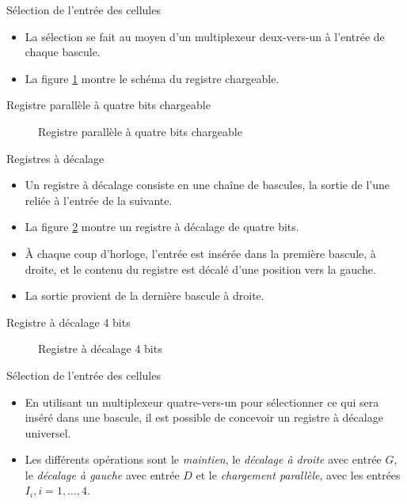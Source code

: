 \documentclass[presentation]{beamer}
\begin{document}
\begin{frame}[label={sec:orgb2738b8}]{Sélection de l'entrée des cellules}
\begin{itemize}
\item La sélection se fait au moyen d'un multiplexeur deux-vers-un à l'entrée de chaque bascule.

\item La figure \ref{fig:orga594bbf} montre le schéma du registre chargeable.
\end{itemize}
\end{frame}

\begin{frame}[label={sec:org31e78be}]{Registre parallèle à quatre bits chargeable}
\begin{figure}[htbp]
\centering

\caption{\label{fig:orga594bbf}Registre parallèle à quatre bits chargeable}
\end{figure}
\end{frame}

\begin{frame}[label={sec:org700ce2c}]{Registres à décalage}
\begin{itemize}
\item Un registre à décalage consiste en une chaîne de bascules, la sortie de l'une reliée à l'entrée de la suivante.

\item La figure \ref{fig:org0e3ffe0} montre un registre à décalage de quatre bits.

\item À chaque coup d'horloge, l'entrée est insérée dans la première bascule, à droite, et le contenu du registre est décalé d'une position vers la gauche.

\item La sortie provient de la dernière bascule à droite.
\end{itemize}
\end{frame}

\begin{frame}[label={sec:org24cf9db}]{Registre à décalage 4 bits}
\begin{figure}[htbp]
\centering

\caption{\label{fig:org0e3ffe0}Registre à décalage 4 bits}
\end{figure}
\end{frame}

\begin{frame}[label={sec:orge77b2c6}]{Sélection de l'entrée des cellules}
\begin{itemize}
\item En utilisant un multiplexeur quatre-vers-un pour sélectionner ce qui sera inséré dans une bascule, il est possible de concevoir un registre à décalage universel.

\item Les différents opérations sont le \emph{maintien}, le \emph{décalage à droite} avec entrée \(G\), le \emph{décalage à gauche} avec entrée \(D\) et le \emph{chargement parallèle}, avec les entrées \(I_i, i=1, \ldots, 4\).
\end{itemize}
\end{frame}
\end{document}
